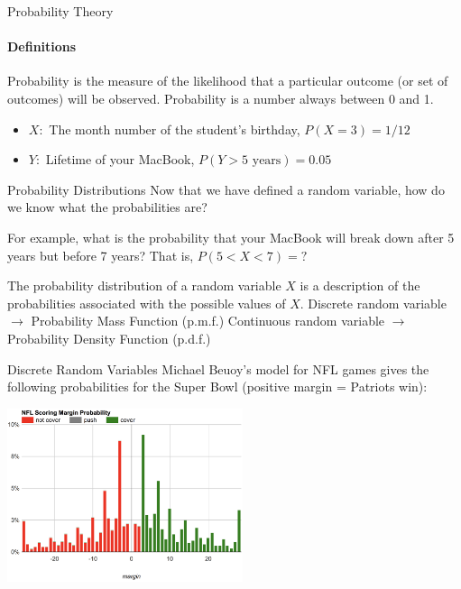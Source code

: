 \documentclass{beamer}\usepackage[]{graphicx}\usepackage[]{color}
\begin{document}
\begin{darkframes}
\begin{frame}{Probability Theory}
\framesubtitle{Definitions}
\begin{definition}
	\alert{Probability} is the measure of the likelihood that a particular outcome (or set of outcomes) will be observed. Probability is a number always between 0 and 1.
\end{definition} \pause

\begin{itemize}[<+->]
  \item $X:$ The month number of the student's birthday, $P(X=3)=1/12$
	\item $Y:$ Lifetime of your MacBook, $ P(Y>5\text{ years})  = 0.05$
\end{itemize}
\end{frame}


\begin{frame}{Probability Distributions}
Now that we have defined a random variable, how do we know what the probabilities are? \newline \pause

For example, what is the probability that your MacBook will break down after 5 years but before 7 years? That is, $P(5<X<7)=?$\newline \pause

\begin{definition}
	The \alert{probability distribution} of a random variable $X$ is a description of the probabilities associated with the possible values of $X$. \newline \pause
	Discrete random variable $\rightarrow$ Probability Mass Function (p.m.f.) \pause
	Continuous random variable $\rightarrow$ Probability Density Function (p.d.f.)
\end{definition}
\end{frame}


\begin{frame}{Discrete Random Variables}
  Michael Beuoy's model for NFL games gives the following probabilities for the Super Bowl (positive margin = Patriots win):

  \begin{center}
    \includegraphics[height=2in]{super-bowl}
  \end{center}
\end{frame}


\end{darkframes}
\end{document}
